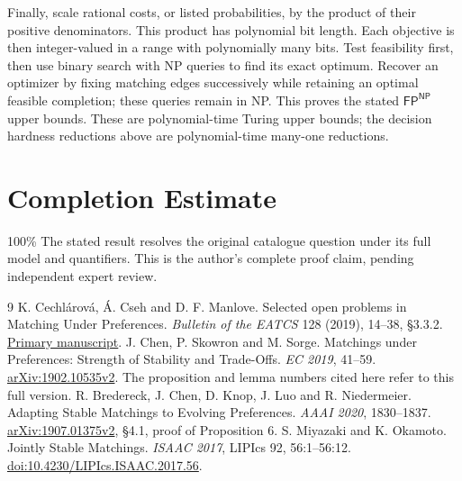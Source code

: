 \documentclass[11pt]{article}
\newcommand{\NP}{\mathsf{NP}}
\newcommand{\FP}{\mathsf{FP}}
\begin{document}
Finally, scale rational costs, or listed probabilities, by the product
of their positive denominators. This product has polynomial bit length.
Each objective is then integer-valued in a range with polynomially many
bits. Test feasibility first, then use binary search with NP queries to
find its exact optimum. Recover an optimizer by fixing matching edges
successively while retaining an optimal feasible completion; these
queries remain in NP. This proves the stated $\FP^{\NP}$ upper bounds.
These are polynomial-time Turing upper bounds; the decision hardness
reductions above are polynomial-time many-one reductions.

\section*{Completion Estimate}
100\%
The stated result resolves the original catalogue question under its full
model and quantifiers. This is the author's complete proof claim, pending
independent expert review.

\begin{thebibliography}{9}
 K. Cechl\'arov\'a, \'A. Cseh and D. F. Manlove.
Selected open problems in Matching Under Preferences.
\emph{Bulletin of the EATCS} 128 (2019), 14--38, \S3.3.2.
\href{https://hpi.de/friedrich/docs/publications/2019/BEATCS.pdf}{Primary manuscript}.
 J. Chen, P. Skowron and M. Sorge.
Matchings under Preferences: Strength of Stability and Trade-Offs.
\emph{EC 2019}, 41--59.
\href{https://arxiv.org/pdf/1902.10535v2}{arXiv:1902.10535v2}.
The proposition and lemma numbers cited here refer to this full version.
 R. Bredereck, J. Chen, D. Knop, J. Luo and R. Niedermeier.
Adapting Stable Matchings to Evolving Preferences.
\emph{AAAI 2020}, 1830--1837.
\href{https://arxiv.org/pdf/1907.01375v2}{arXiv:1907.01375v2}, \S4.1,
proof of Proposition 6.
 S. Miyazaki and K. Okamoto.
Jointly Stable Matchings.
\emph{ISAAC 2017}, LIPIcs 92, 56:1--56:12.
\href{https://doi.org/10.4230/LIPIcs.ISAAC.2017.56}{doi:10.4230/LIPIcs.ISAAC.2017.56}.
\end{thebibliography}
\end{document}
